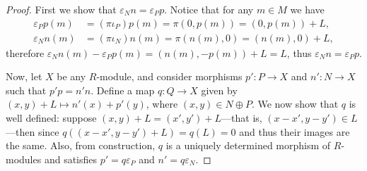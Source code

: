 \begin{proof}
First we show that \(\varepsilon_N n = \varepsilon_P p\). Notice that for any
\(m \in M\) we have
\begin{align*}
\varepsilon_P p(m) &= (\pi \iota_P) p(m) = \pi(0, p(m)) = (0, p(m)) + L, \\
\varepsilon_N n(m) &= (\pi \iota_N) n(m) = \pi(n(m), 0) = (n(m), 0) + L,
\end{align*}
therefore \(\varepsilon_N n(m) - \varepsilon_P p(m) = (n(m), -p(m)) + L = L\),
thus \(\varepsilon_N n = \varepsilon_P p\).

Now, let \(X\) be any \(R\)-module, and consider morphisms \(p': P \to X\) and
\(n': N \to X\) such that \(p' p = n' n\). Define a map \(q: Q \to X\) given by
\((x, y) + L \mapsto n'(x) + p'(y)\), where \((x, y) \in N \oplus P\). We now
show that \(q\) is well defined: suppose \((x, y) + L = (x', y') + L\)---that
is, \((x - x', y - y') \in L\)---then since
\(q((x - x', y - y') + L) = q(L) = 0\) and thus their images are the same. Also,
from construction, \(q\) is a uniquely determined morphism of \(R\)-modules and
satisfies \(p' = q \varepsilon_P\) and \(n' = q \varepsilon_N\).
\end{proof}

